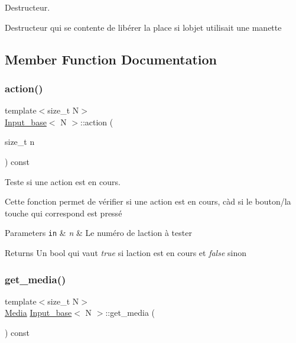 Destructeur. 

Destructeur qui se contente de libérer la place si l\textquotesingle{}objet utilisait une manette 

\subsection{Member Function Documentation}
\mbox{\label{class_input__base_a2ac741377832fd670954dba5abf82a10}} 
\subsubsection{\texorpdfstring{action()}{action()}}
{\footnotesize\ttfamily template$<$size\+\_\+t N$>$ \\
\mbox{\hyperlink{class_input__base}{Input\+\_\+base}}$<$ N $>$\+::action (\begin{DoxyParamCaption}\item[{size\+\_\+t}]{n }\end{DoxyParamCaption}) const}



Teste si une action est en cours. 

Cette fonction permet de vérifier si une action est en cours, càd si le bouton/la touche qui correspond est pressé 
\begin{DoxyParams}[1]{Parameters}
\mbox{\tt in}  & {\em n} & Le numéro de l\textquotesingle{}action à tester \\
\hline
\end{DoxyParams}
\begin{DoxyReturn}{Returns}
Un {\ttfamily bool} qui vaut {\itshape true} si l\textquotesingle{}action est en cours et {\itshape false} sinon 
\end{DoxyReturn}
\mbox{\label{class_input__base_a4401384d72363249b975aa2611164f39}} 
\subsubsection{\texorpdfstring{get\+\_\+media()}{get\_media()}}
{\footnotesize\ttfamily template$<$size\+\_\+t N$>$ \\
\mbox{\hyperlink{class_input__base_a455585e7933485981b3d7bfcad3a47c6}{Media}} \mbox{\hyperlink{class_input__base}{Input\+\_\+base}}$<$ N $>$\+::get\+\_\+media (\begin{DoxyParamCaption}{ }\end{DoxyParamCaption}) const\hspace{0.3cm}{\ttfamily [inline]}}

